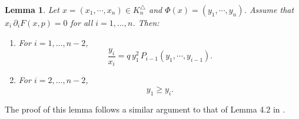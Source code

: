 \documentclass[a4paper,fleqn,numbers]{cas-sc}
\newtheorem{lemma}[theorem]{Lemma}
\begin{document}
	\begin{lemma}
		Let \( x=(x_1,\cdots,x_n)\in K_n^{\triangle} \) and \( \Phi(x)=(y_1,\cdots,y_n) \). Assume that \( x_i\,\partial_i F(x,p)=0 \) for all \( i=1,\ldots,n \). Then:
		\begin{enumerate}
			\item For \( i=1,\ldots,n-2 \),
			\[
			\frac{y_i}{x_i} = q\,y_1^2\,P_{i-1}(y_1,\cdots,y_{i-1}).
			\]
			\item For \( i=2,\ldots,n-2 \),
			\[
			y_1 \geq y_i.
			\]
		\end{enumerate}
	\end{lemma}
	
	The proof of this lemma follows a similar argument to that of Lemma 4.2 in \cite{ando2013}.
	
%		
%		
%		
%		
%		
\end{document}
